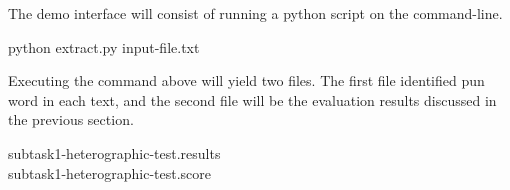 \documentclass{article}
\begin{document}
The demo interface will consist of running a python script on the command-line.\\

\begin{center}
python extract.py input-file.txt\\
\end{center}


\noindent Executing the command above will yield two files.
The first file identified pun word in
each text, and the second file will be the evaluation results discussed in the previous
section.\\

\begin{center}
subtask1-heterographic-test.results\\
subtask1-heterographic-test.score
\end{center}
\end{document}
